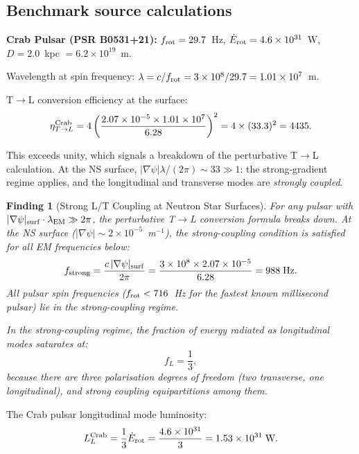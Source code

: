 \documentclass[11pt]{article}
\newtheorem{finding}{Finding}
\newcommand{\ee}[1]{\times 10^{#1}}
\begin{document}
\subsection{Benchmark source calculations}

\textbf{Crab Pulsar (PSR B0531+21):}
$f_{\rm rot} = 29.7$~Hz, $\dot{E}_{\rm rot} = 4.6\ee{31}$~W,
$D = 2.0$~kpc $= 6.2\ee{19}$~m.

Wavelength at spin frequency: $\lambda = c/f_{\rm rot}
= 3\ee{8}/29.7 = 1.01\ee{7}$~m.

T$\to$L conversion efficiency at the surface:
\begin{equation}
\eta_{T\to L}^{\rm Crab} = 4\left(\frac{2.07\ee{-5}
\times 1.01\ee{7}}{6.28}\right)^2
= 4 \times (33.3)^2 = 4435.
\end{equation}

This exceeds unity, which signals a breakdown of the perturbative
T$\to$L calculation. At the NS surface, $|\nabla\psi| \lambda/(2\pi)
\sim 33 \gg 1$: the strong-gradient regime applies, and the
longitudinal and transverse modes are \textit{strongly coupled}.

\begin{finding}[Strong L/T Coupling at Neutron Star Surfaces]
\label{find:strong-coupling}
For any pulsar with $|\nabla\psi|_{\rm surf} \cdot \lambda_{\rm EM}
\gg 2\pi$, the perturbative T$\to$L conversion formula breaks down.
At the NS surface ($|\nabla\psi| \sim 2\ee{-5}$~m$^{-1}$), the
strong-coupling condition is satisfied for all EM frequencies below:
\begin{equation}
f_{\rm strong} = \frac{c\,|\nabla\psi|_{\rm surf}}{2\pi}
= \frac{3\ee{8} \times 2.07\ee{-5}}{6.28} = 988\;\text{Hz}.
\end{equation}
All pulsar spin frequencies ($f_{\rm rot} < 716$~Hz for the fastest
known millisecond pulsar) lie in the strong-coupling regime.

In the strong-coupling regime, the fraction of energy radiated as
longitudinal modes saturates at:
\begin{equation}
\boxed{f_L = \frac{1}{3},}
\end{equation}
because there are three polarisation degrees of freedom (two
transverse, one longitudinal), and strong coupling equipartitions
among them.
\end{finding}

The Crab pulsar longitudinal mode luminosity:
\begin{equation}
L_L^{\rm Crab} = \frac{1}{3}\dot{E}_{\rm rot} = \frac{4.6\ee{31}}{3}
= 1.53\ee{31}\;\text{W}.
\end{equation}
\end{document}
